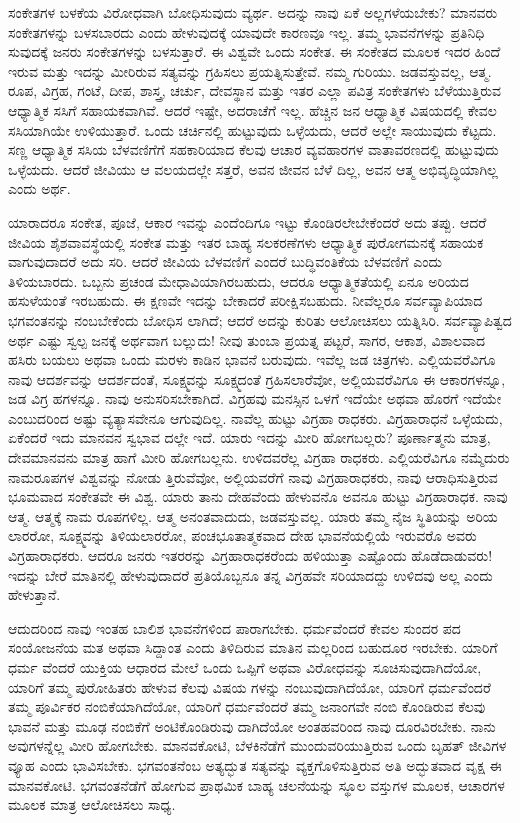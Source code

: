 ಸಂಕೇತಗಳ ಬಳಕೆಯ ವಿರೋಧವಾಗಿ ಬೋಧಿಸುವುದು ವ್ಯರ್ಥ. ಅದನ್ನು ನಾವು ಏಕೆ ಅಲ್ಲಗಳೆಯಬೇಕು? ಮಾನವರು ಸಂಕೇತಗಳನ್ನು ಬಳಸಬಾರದು ಎಂದು ಹೇಳುವುದಕ್ಕೆ ಯಾವುದೇ ಕಾರಣವೂ ಇಲ್ಲ. ತಮ್ಮ ಭಾವನೆಗಳನ್ನು ಪ್ರತಿನಿಧಿ ಸುವುದಕ್ಕೆ ಜನರು ಸಂಕೇತಗಳನ್ನು ಬಳಸುತ್ತಾರೆ. ಈ ವಿಶ್ವವೇ ಒಂದು ಸಂಕೇತ. ಈ ಸಂಕೇತದ ಮೂಲಕ ಇದರ ಹಿಂದೆ ಇರುವ ಮತ್ತು ಇದನ್ನು ಮೀರಿರುವ ಸತ್ಯವನ್ನು ಗ್ರಹಿಸಲು ಪ್ರಯತ್ನಿಸುತ್ತೇವೆ. ನಮ್ಮ ಗುರಿಯು. ಜಡವಸ್ತುವಲ್ಲ, ಆತ್ಮ. ರೂಪ, ವಿಗ್ರಹ, ಗಂಟೆ, ದೀಪ, ಶಾಸ್ತ್ರ, ಚರ್ಚು, ದೇವಸ್ಥಾನ ಮತ್ತು ಇತರ ಎಲ್ಲಾ ಪವಿತ್ರ ಸಂಕೇತಗಳು ಬೆಳೆಯುತ್ತಿರುವ ಆಧ್ಯಾತ್ಮಿಕ ಸಸಿಗೆ ಸಹಾಯಕವಾಗಿವೆ. ಆದರೆ ಇಷ್ಟೇ, ಅದರಾಚೆಗೆ ಇಲ್ಲ. ಹೆಚ್ಚಿನ ಜನ ಆಧ್ಯಾತ್ಮಿಕ ವಿಷಯದಲ್ಲಿ ಕೇವಲ ಸಸಿಯಾಗಿಯೇ ಉಳಿಯುತ್ತಾರೆ. ಒಂದು ಚರ್ಚಿನಲ್ಲಿ ಹುಟ್ಟುವುದು ಒಳ್ಳೆಯದು, ಆದರೆ ಅಲ್ಲೇ ಸಾಯುವುದು ಕೆಟ್ಟದು. ಸಣ್ಣ ಆಧ್ಯಾತ್ಮಿಕ ಸಸಿಯ ಬೆಳವಣಿಗೆಗೆ ಸಹಕಾರಿಯಾದ ಕೆಲವು ಆಚಾರ ವ್ಯವಹಾರಗಳ ವಾತಾವರಣದಲ್ಲಿ ಹುಟ್ಟುವುದು ಒಳ್ಳೆಯದು. ಆದರೆ ಜೀವಿಯು ಆ ವಲಯದಲ್ಲೇ ಸತ್ತರೆ, ಅವನ ಜೀವನ ಬೆಳೆ ದಿಲ್ಲ, ಅವನ ಆತ್ಮ ಅಭಿವೃದ್ಧಿಯಾಗಿಲ್ಲ ಎಂದು ಅರ್ಥ.

ಯಾರಾದರೂ ಸಂಕೇತ, ಪೂಜೆ, ಆಕಾರ ಇವನ್ನು ಎಂದೆಂದಿಗೂ ಇಟ್ಟು ಕೊಂಡಿರಲೇಬೇಕೆಂದರೆ ಅದು ತಪ್ಪು. ಆದರೆ ಜೀವಿಯ ಶೈಶವಾವಸ್ಥೆಯಲ್ಲಿ ಸಂಕೇತ ಮತ್ತು ಇತರ ಬಾಹ್ಯ ಸಲಕರಣೆಗಳು ಆಧ್ಯಾತ್ಮಿಕ ಪುರೋಗಮನಕ್ಕೆ ಸಹಾಯಕ ವಾಗುವುದಾದರೆ ಅದು ಸರಿ. ಆದರೆ ಜೀವಿಯ ಬೆಳವಣಿಗೆ ಎಂದರೆ ಬುದ್ಧಿವಂತಿಕೆಯ ಬೆಳವಣಿಗೆ ಎಂದು ತಿಳಿಯಬಾರದು. ಒಬ್ಬನು ಪ್ರಚಂಡ ಮೇಧಾವಿಯಾಗಿರಬಹುದು, ಆದರೂ ಆಧ್ಯಾತ್ಮಿಕತೆಯಲ್ಲಿ ಏನೂ ಅರಿಯದ ಹಸುಳೆಯಂತೆ ಇರಬಹುದು. ಈ ಕ್ಷಣವೇ ಇದನ್ನು ಬೇಕಾದರೆ ಪರೀಕ್ಷಿಸಬಹುದು. ನೀವೆಲ್ಲರೂ ಸರ್ವವ್ಯಾಪಿಯಾದ ಭಗವಂತನನ್ನು ನಂಬಬೇಕೆಂದು ಬೋಧಿಸ ಲಾಗಿದೆ; ಆದರೆ ಅದನ್ನು ಕುರಿತು ಆಲೋಚಿಸಲು ಯತ್ನಿಸಿರಿ. ಸರ್ವವ್ಯಾಪಿತ್ವದ ಅರ್ಥ ಎಷ್ಟು ಸ್ವಲ್ಪ ಜನಕ್ಕೆ ಅರ್ಥವಾಗ ಬಲ್ಲುದು! ನೀವು ತುಂಬಾ ಪ್ರಯತ್ನ ಪಟ್ಟರೆ, ಸಾಗರ, ಆಕಾಶ, ವಿಶಾಲವಾದ ಹಸಿರು ಬಯಲು ಅಥವಾ ಒಂದು ಮರಳು ಕಾಡಿನ ಭಾವನೆ ಬರುವುದು. ಇವೆಲ್ಲ ಜಡ ಚಿತ್ರಗಳು. ಎಲ್ಲಿಯವರೆವಿಗೂ ನಾವು ಆದರ್ಶವನ್ನು ಆದರ್ಶದಂತೆ, ಸೂಕ್ಷ್ಮವನ್ನು ಸೂಕ್ಷ್ಮದಂತೆ ಗ್ರಹಿಸಲಾರೆವೋ, ಅಲ್ಲಿಯವರೆವಿಗೂ ಈ ಆಕಾರಗಳನ್ನೂ, ಜಡ ವಿಗ್ರ ಹಗಳನ್ನೂ. ನಾವು ಅನುಸರಿಸಬೇಕಾಗಿದೆ. ವಿಗ್ರಹವು ಮನಸ್ಸಿನ ಒಳಗೆ ಇದೆಯೇ ಅಥವಾ ಹೊರಗೆ ಇದೆಯೇ ಎಂಬುದರಿಂದ ಅಷ್ಟು ವ್ಯತ್ಯಾಸವೇನೂ ಆಗುವುದಿಲ್ಲ. ನಾವೆಲ್ಲ ಹುಟ್ಟು ವಿಗ್ರಹಾ ರಾಧಕರು. ವಿಗ್ರಹಾರಾಧನೆ ಒಳ್ಳೆಯದು, ಏಕೆಂದರೆ ಇದು ಮಾನವನ ಸ್ವಭಾವ ದಲ್ಲೇ ಇದೆ. ಯಾರು ಇದನ್ನು ಮೀರಿ ಹೋಗಬಲ್ಲರು? ಪೂರ್ಣಾತ್ಮನು ಮಾತ್ರ, ದೇವಮಾನವನು ಮಾತ್ರ ಹಾಗೆ ಮೀರಿ ಹೋಗಬಲ್ಲನು. ಉಳಿದವರೆಲ್ಲ ವಿಗ್ರಹಾ ರಾಧಕರು. ಎಲ್ಲಿಯರೆವಿಗೂ ನಮ್ಮೆದುರು ನಾಮರೂಪಗಳ ವಿಶ್ವವನ್ನು ನೋಡು ತ್ತಿರುವೆವೋ, ಅಲ್ಲಿಯವರೆಗೆ ನಾವು ವಿಗ್ರಹಾರಾಧಕರು, ನಾವು ಆರಾಧಿಸುತ್ತಿರುವ ಭೂಮವಾದ ಸಂಕೇತವೇ ಈ ವಿಶ್ವ. ಯಾರು ತಾನು ದೇಹವೆಂದು ಹೇಳುವನೊ ಅವನೂ ಹುಟ್ಟು ವಿಗ್ರಹಾರಾಧಕ. ನಾವು ಆತ್ಮ. ಆತ್ಮಕ್ಕೆ ನಾಮ ರೂಪಗಳಿಲ್ಲ. ಆತ್ಮ ಅನಂತವಾದುದು, ಜಡವಸ್ತುವಲ್ಲ. ಯಾರು ತಮ್ಮ ನೈಜ ಸ್ಥಿತಿಯನ್ನು ಅರಿಯ ಲಾರರೋ, ಸೂಕ್ಷ್ಮವನ್ನು ತಿಳಿಯಲಾರರೋ, ಪಂಚಭೂತಾತ್ಮಕವಾದ ದೇಹ ಭಾವನೆಯಲ್ಲಿಯೆ ಇರುವರೊ ಅವರು ವಿಗ್ರಹಾರಾಧಕರು. ಆದರೂ ಜನರು ಇತರರನ್ನು ವಿಗ್ರಹಾರಾಧಕರೆಂದು ಹಳಿಯುತ್ತಾ ಎಷ್ಟೊಂದು ಹೊಡೆದಾಡುವರು! ಇದನ್ನು ಬೇರೆ ಮಾತಿನಲ್ಲಿ ಹೇಳುವುದಾದರೆ ಪ್ರತಿಯೊಬ್ಬನೂ ತನ್ನ ವಿಗ್ರಹವೇ ಸರಿಯಾದದ್ದು ಉಳಿದವು ಅಲ್ಲ ಎಂದು ಹೇಳುತ್ತಾನೆ.

ಆದುದರಿಂದ ನಾವು ಇಂತಹ ಬಾಲಿಶ ಭಾವನೆಗಳಿಂದ ಪಾರಾಗಬೇಕು. ಧರ್ಮವೆಂದರೆ ಕೇವಲ ಸುಂದರ ಪದ ಸಂಯೋಜನೆಯ ಮತ ಅಥವಾ ಸಿದ್ದಾಂತ ಎಂದು ತಿಳಿದಿರುವ ಮಾತಿನ ಮಲ್ಲರಿಂದ ಬಹುದೂರ ಇರಬೇಕು. ಯಾರಿಗೆ ಧರ್ಮ ವೆಂದರೆ ಯುಕ್ತಿಯ ಆಧಾರದ ಮೇಲೆ ಒಂದು ಒಪ್ಪಿಗೆ ಅಥವಾ ವಿರೋಧವನ್ನು ಸೂಚಿಸುವುದಾಗಿದೆಯೋ, ಯಾರಿಗೆ ತಮ್ಮ ಪುರೋಹಿತರು ಹೇಳುವ ಕೆಲವು ವಿಷಯ ಗಳನ್ನು ನಂಬುವುದಾಗಿದೆಯೋ, ಯಾರಿಗೆ ಧರ್ಮವೆಂದರೆ ತಮ್ಮ ಪೂರ್ವಿಕರ ನಂಬಿಕೆಯಾಗಿದೆಯೋ, ಯಾರಿಗೆ ಧರ್ಮವೆಂದರೆ ತಮ್ಮ ಜನಾಂಗವೇ ನಂಬಿ ಕೊಂಡಿರುವ ಕೆಲವು ಭಾವನೆ ಮತ್ತು ಮೂಢ ನಂಬಿಕೆಗೆ ಅಂಟಿಕೊಂಡಿರುವು ದಾಗಿದೆಯೋ ಅಂತಹವರಿಂದ ನಾವು ದೂರವಿರಬೇಕು. ನಾನು ಅವುಗಳನ್ನೆಲ್ಲ ಮೀರಿ ಹೋಗಬೇಕು. ಮಾನವಕೋಟಿ, ಬೆಳಕಿನೆಡೆಗೆ ಮುಂದುವರಿಯುತ್ತಿರುವ ಒಂದು ಬೃಹತ್​ ಜೀವಿಗಳ ವ್ಯೂಹ ಎಂದು ಭಾವಿಸಬೇಕು. ಭಗವಂತನೆಂಬ ಅತ್ಯದ್ಭುತ ಸತ್ಯವನ್ನು ವ್ಯಕ್ತಗೊಳಿಸುತ್ತಿರುವ ಅತಿ ಅದ್ಭುತವಾದ ವೃಕ್ಷ ಈ ಮಾನವಕೋಟಿ. ಭಗವಂತನೆಡೆಗೆ ಹೋಗುವ ಪ್ರಾಥಮಿಕ ಬಾಹ್ಯ ಚಲನೆಯನ್ನು ಸ್ಥೂಲ ವಸ್ತುಗಳ ಮೂಲಕ, ಆಚಾರಗಳ ಮೂಲಕ ಮಾತ್ರ ಆಲೋಚಿಸಲು ಸಾಧ್ಯ.


